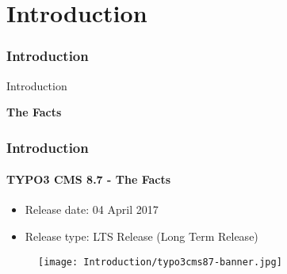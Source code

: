 %

\section{Introduction}
\begin{frame}[fragile]
	\frametitle{Introduction}

	\begin{center}\huge{Introduction}\end{center}
	\begin{center}\huge{\color{typo3darkgrey}\textbf{The Facts}}\end{center}

\end{frame}

\begin{frame}[fragile]
	\frametitle{Introduction}
	\framesubtitle{TYPO3 CMS 8.7 - The Facts}

	\begin{itemize}
		\item Release date: 04 April 2017
		\item Release type: LTS Release (Long Term Release)
	\end{itemize}

	\begin{figure}
		\texttt{[image: Introduction/typo3cms87-banner.jpg]}
	\end{figure}

\end{frame}

